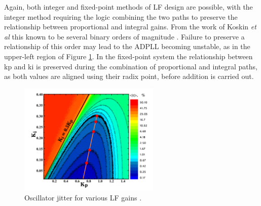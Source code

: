 Again, both integer and fixed-point methods of \ac{LF} design are possible, with the integer method requiring the logic combining the two paths to preserve the relationship between proportional and integral gains. From the work of Koskin \textit{et al} this known to be several binary orders of magnitude \cite{koskin2018generation}. Failure to preserve a relationship of this order may lead to the \ac{ADPLL} becoming unstable, as in the upper-left region of Figure \ref{fig:gain_grid}. In the fixed-point system the relationship between \ac{kp} and \ac{ki} is preserved during the combination of proportional and integral paths, as both values are aligned using their radix point, before addition is carried out.
\begin{figure}[h]
	\centering
	\includegraphics[width=0.6\textwidth]{../eugene}
	\caption[Oscillator jitter for various \acl{LF} gains]{Oscillator jitter for various \acl{LF} gains \cite{koskin2018generation}.}
	\label{fig:gain_grid}
\end{figure}